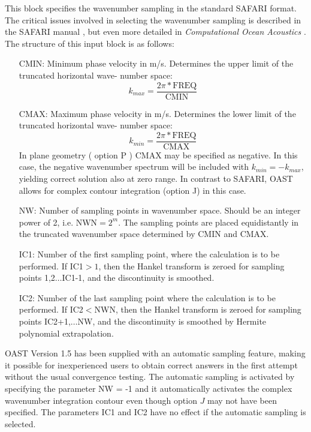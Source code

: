 This block specifies the wavenumber sampling in the standard SAFARI
format. The critical issues involved in selecting the wavenumber
sampling is described in the SAFARI manual \cite{hs:saf}, but even
more detailed in {\em Computational Ocean Acoustics} \cite{jkps}. 
The structure of this input block is  as follows:
\begin{itemize}
		\item[CMIN:]   Minimum phase velocity in m/s. Determines the
		upper limit of the truncated horizontal wave-
		number space:
			\begin{displaymath}
			k_{max} = \frac{2\pi \ast \mbox{FREQ}}{\mbox{CMIN}}
			\end{displaymath}
		\item[CMAX:]	Maximum phase velocity in m/s. Determines the
		lower limit of the truncated horizontal wave-
		number space:
			\begin{displaymath}
			k_{min} = \frac{2\pi \ast \mbox{FREQ}}{\mbox{CMAX}}
			\end{displaymath}
		In plane geometry ( option P ) CMAX may be specified as 
		negative. In this case, the negative wavenumber spectrum
		will be included with $k_{min}=-k_{max}$, yielding correct 
		solution also at zero range. In contrast to SAFARI,
OAST allows for complex contour integration (option J) in this case.
		\item[NW:]	Number of sampling points in wavenumber space.
		Should be an integer power of 2, i.e. NWN$=2^{m}$.
		The sampling points are placed equidistantly
		in the truncated wavenumber space determined
		by CMIN and CMAX.

		\item[IC1:]  Number of the first sampling point, where the
		calculation is to be performed. If IC1$>1$, 
		then the Hankel transform is zeroed for sampling 
		points 1,2$\ldots$IC1-1, and the discontinuity
		is smoothed.

		\item[IC2:]	Number of the last sampling point where the 
		calculation is to be performed. If IC2$<$NWN,
		then the Hankel transform is zeroed for sampling
		points IC2+1,$\ldots$NW, and the discontinuity
		is smoothed by Hermite polynomial extrapolation.
		\end{itemize}


    OAST Version  1.5  has been supplied with  an  automatic  sampling 
feature,  making  it possible for inexperienced users  to  obtain 
correct   answers  in  the  first  attempt  without   the   usual 
convergence  testing.  The  automatic sampling  is  activated  by 
specifying the parameter NW = -1 and it automatically  activates 
the  complex wavenumber integration contour even though option  $J$ 
may  not have been specified. The parameters IC1 and IC2 have  no 
effect if the automatic sampling is selected.

